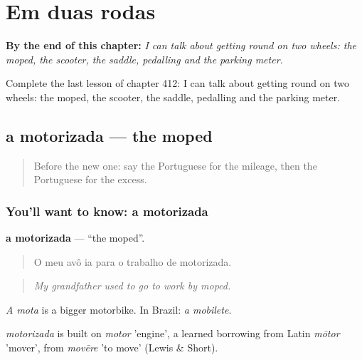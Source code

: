 
\chapter{Em duas rodas}
\label{ch:pt-em-duas-rodas}

\begin{chapteropening}
\textbf{By the end of this chapter:} \emph{I can talk about getting round on two wheels: the moped, the scooter, the saddle, pedalling and the parking meter.}

Complete the last lesson of chapter 412: I can talk about getting round on two wheels: the moped, the scooter, the saddle, pedalling and the parking meter.
\end{chapteropening}

\section[a motorizada]{a motorizada — the moped}

\label{lesson:PT-C412-motorizada}



\begin{quote}
Before the new one: say the Portuguese for the mileage, then the Portuguese for the excess.
\end{quote}

\subsection*{You'll want to know: a motorizada}
\textbf{a motorizada} — \textquotedblleft{}the moped\textquotedblright{}.

\begin{quote}
O meu avô ia para o trabalho de motorizada.
\end{quote}

\begin{quote}
\emph{My grandfather used to go to work by moped.}
\end{quote}

\emph{A mota} is a bigger motorbike. In Brazil: \emph{a mobilete}.

\begin{cousinweb}
\emph{motorizada} is built on \emph{motor} 'engine', a learned borrowing from Latin \emph{mōtor} 'mover', from \emph{movēre} 'to move' (Lewis \& Short).
\end{cousinweb}

